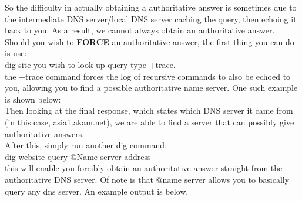 \documentclass{article}
\begin{document}
So the difficulty in actually obtaining a authoritative answer is sometimes due to the intermediate DNS server/local DNS server caching the query, then echoing it back to you. As a result, we cannot always obtain an authoritative answer. Should you wish to \textbf{FORCE} an authoritative answer, the first thing you can do is use: \\
dig {site you wish to look up} {query type} +trace.\\
the +trace command forces the log of recursive commands to also be echoed to you, allowing you to find a possible authoritative name server. One such example is shown below:\\
\noindent{}
Then looking at the final response, which states which DNS server it came from (in this case, asia1.akam.net), we are able to find a server that can possibly give authoritative answers.\\
After this, simply run another dig command:\\
dig {website} {query} @{Name server address}\\
this will enable you forcibly obtain an authoritative answer straight from the authoritative DNS server. Of note is that @{name server} allows you to basically query any dns server. An example output is below.\\
\end{document}
